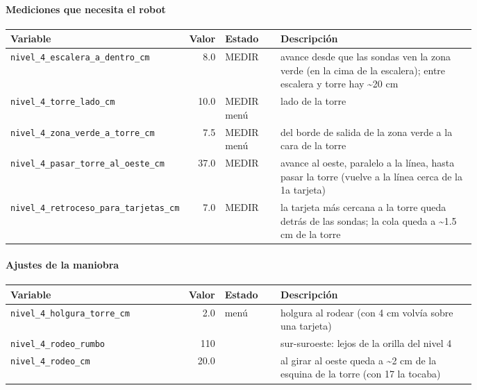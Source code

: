 \paragraph{Mediciones que necesita el robot}
\begin{longtable}{@{}p{0.36\linewidth}rlp{0.42\linewidth}@{}}\toprule
\textbf{Variable} & \textbf{Valor} & \textbf{Estado} & \textbf{Descripci\'on} \\\midrule\endhead
\texttt{nivel\_\allowbreak{}4\_\allowbreak{}escalera\_\allowbreak{}a\_\allowbreak{}dentro\_\allowbreak{}cm} & 8.0 & MEDIR & avance desde que las sondas ven la zona verde (en la cima de la escalera); entre escalera y torre hay \textasciitilde{}20 cm \\
\texttt{nivel\_\allowbreak{}4\_\allowbreak{}torre\_\allowbreak{}lado\_\allowbreak{}cm} & 10.0 & MEDIR menú & lado de la torre \\
\texttt{nivel\_\allowbreak{}4\_\allowbreak{}zona\_\allowbreak{}verde\_\allowbreak{}a\_\allowbreak{}torre\_\allowbreak{}cm} & 7.5 & MEDIR menú & del borde de salida de la zona verde a la cara de la torre \\
\texttt{nivel\_\allowbreak{}4\_\allowbreak{}pasar\_\allowbreak{}torre\_\allowbreak{}al\_\allowbreak{}oeste\_\allowbreak{}cm} & 37.0 & MEDIR & avance al oeste, paralelo a la línea, hasta pasar la torre (vuelve a la línea cerca de la 1a tarjeta) \\
\texttt{nivel\_\allowbreak{}4\_\allowbreak{}retroceso\_\allowbreak{}para\_\allowbreak{}tarjetas\_\allowbreak{}cm} & 7.0 & MEDIR & la tarjeta más cercana a la torre queda detrás de las sondas; la cola queda a \textasciitilde{}1.5 cm de la torre \\
\bottomrule\end{longtable}
\paragraph{Ajustes de la maniobra}
\begin{longtable}{@{}p{0.36\linewidth}rlp{0.42\linewidth}@{}}\toprule
\textbf{Variable} & \textbf{Valor} & \textbf{Estado} & \textbf{Descripci\'on} \\\midrule\endhead
\texttt{nivel\_\allowbreak{}4\_\allowbreak{}holgura\_\allowbreak{}torre\_\allowbreak{}cm} & 2.0 & menú & holgura al rodear (con 4 cm volvía sobre una tarjeta) \\
\texttt{nivel\_\allowbreak{}4\_\allowbreak{}rodeo\_\allowbreak{}rumbo} & 110 &  & sur-suroeste: lejos de la orilla del nivel 4 \\
\texttt{nivel\_\allowbreak{}4\_\allowbreak{}rodeo\_\allowbreak{}cm} & 20.0 &  & al girar al oeste queda a \textasciitilde{}2 cm de la esquina de la torre (con 17 la tocaba) \\
\bottomrule\end{longtable}
